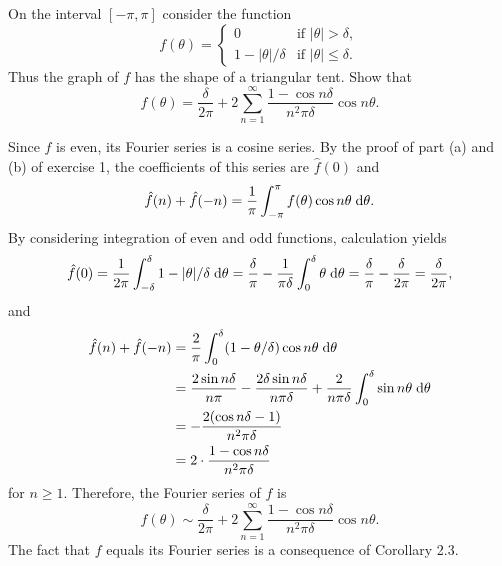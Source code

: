 \begin{exrc}[5]
    On the interval \([-\pi, \pi]\) consider the function
    \begin{equation*}
        f(\theta) = 
        \begin{cases}
            0 & \text{if \(|\theta| > \delta\)},\\
            1 - |\theta| / \delta & \text{if \(|\theta| \leq \delta\)}.
        \end{cases}
    \end{equation*}
    Thus the graph of \(f\) has the shape of a triangular tent.
    Show that
    \begin{equation*}
        f(\theta) = \frac{\delta}{2\pi} + 2 \sum_{n = 1}^{\infty} \frac{1 - \cos n\delta}{n^2 \pi \delta} \cos n\theta.
    \end{equation*}

\begin{soln}
    Since \(f\) is even, 
    its Fourier series is a cosine series.
    By the proof of part (a) and (b) of exercise 1,
    the coefficients of this series are \(\hat{f}(0)\) and
    \begin{equation*}
        \hat{f}(n) + \hat{f}(-n) = \frac{1}{\pi} \int_{-\pi}^{\pi} f(\theta) \cos n\theta \;\mathrm d \theta.
    \end{equation*}
    By considering integration of even and odd functions, calculation yields
    \begin{equation*}
        \hat{f}(0)
        = \frac{1}{2\pi} \int_{-\delta}^{\delta} 1 - |\theta| / \delta \;\mathrm d \theta
        = \frac{\delta}{\pi} - \frac{1}{\pi \delta} \int_{0}^{\delta} \theta \;\mathrm d \theta
        = \frac{\delta}{\pi} - \frac{\delta}{2\pi} = \frac{\delta}{2\pi},
    \end{equation*}
    and
    \begin{align*}
        \hat{f}(n) + \hat{f}(-n)
        &= \frac{2}{\pi} \int_{0}^{\delta} (1 - \theta / \delta) \cos n\theta \;\mathrm d \theta \\
        &= \frac{2 \sin n\delta}{n \pi} - \frac{2 \delta \sin n\delta}{n\pi \delta}
        + \frac{2}{n \pi \delta} \int_{0}^{\delta} \sin n\theta \;\mathrm d \theta \\
        &= -\frac{2 (\cos n\delta - 1)}{n^2 \pi \delta}\\
        &= 2 \cdot \frac{1 - \cos n\delta}{n^2 \pi \delta}
    \end{align*}
    for \(n \geq 1\).
    Therefore, the Fourier series of \(f\) is
    \begin{equation*}
        f(\theta) \sim \frac{\delta}{2\pi} + 2 \sum_{n = 1}^{\infty}  \frac{1 - \cos n\delta}{n^2 \pi \delta} \cos n\theta.
    \end{equation*}
    The fact that \(f\) equals its Fourier series is a consequence of Corollary 2.3.

\end{soln}
\end{exrc}
